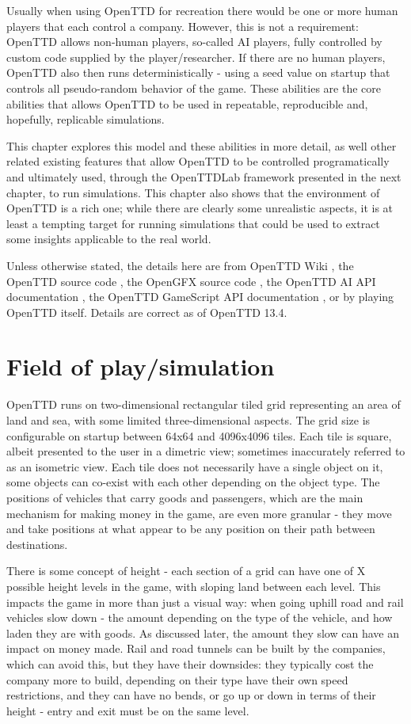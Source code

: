 \documentclass[logo,msc,dsti]{infthesis}    %
\begin{document}
{Usually when using OpenTTD for recreation there would be one or more human players that each control a company. However, this is not a requirement: OpenTTD allows non-human players, so-called AI players, fully controlled by custom code supplied by the player/researcher. If there are no human players, OpenTTD also then runs deterministically - using a seed value on startup that controls all pseudo-random behavior of the game. These abilities are the core abilities that allows OpenTTD to be used in repeatable, reproducible and, hopefully, replicable simulations.

This chapter explores this model and these abilities in more detail, as well other related existing features that allow OpenTTD to be controlled programatically and ultimately used, through the OpenTTDLab framework presented in the next chapter, to run simulations. This chapter also shows that the environment of OpenTTD is a rich one; while there are clearly some unrealistic aspects, it is at least a tempting target for running simulations that could be used to extract some insights applicable to the real world.

Unless otherwise stated, the details here are from OpenTTD Wiki \cite{OpenTTDWiki}, the OpenTTD source code \cite{OpenTTDSource}, the OpenGFX source code \cite{OpenGFXSource}, the OpenTTD AI API documentation \cite{OpenTTDAIAPIDocs}, the OpenTTD GameScript API documentation \cite{OpenTTDGSAPIDocs}, or by playing OpenTTD itself. Details are correct as of OpenTTD 13.4.

\section{Field of play/simulation}

OpenTTD runs on two-dimensional rectangular tiled grid representing an area of land and sea, with some limited three-dimensional aspects. The grid size is configurable on startup between 64x64 and 4096x4096 tiles. Each tile is square, albeit presented to the user in a dimetric view; sometimes inaccurately referred to as an isometric view. Each tile does not necessarily have a single object on it, some objects can co-exist with each other depending on the object type. The positions of vehicles that carry goods and passengers, which are the main mechanism for making money in the game, are even more granular - they move and take positions at what appear to be any position on their path between destinations.

There is some concept of height - each section of a grid can have one of X possible height levels in the game, with sloping land between each level. This impacts the game in more than just a visual way: when going uphill road and rail vehicles slow down - the amount depending on the type of the vehicle, and how laden they are with goods. As discussed later, the amount they slow can have an impact on money made. Rail and road tunnels can be built by the companies, which can avoid this, but they have their downsides: they typically cost the company more to build, depending on their type have their own speed restrictions, and they can have no bends, or go up or down in terms of their height - entry and exit must be on the same level.

}
\end{document}
